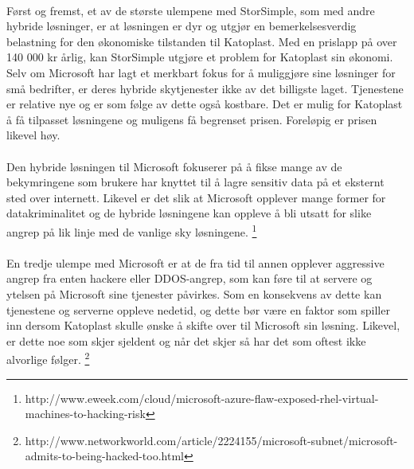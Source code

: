 \paragraph{} Først og fremst, et av de største ulempene med StorSimple, som med andre hybride løsninger, er at løsningen er dyr og utgjør en bemerkelsesverdig belastning for den økonomiske tilstanden til Katoplast. Med en prislapp på over 140 000 kr årlig, kan StorSimple utgjøre et problem for Katoplast sin økonomi. Selv om Microsoft har lagt et merkbart fokus for å muliggjøre sine løsninger for små bedrifter, er deres hybride skytjenester ikke av det billigste laget. Tjenestene er relative nye og er som følge av dette også kostbare. Det er mulig for Katoplast å få tilpasset løsningene og muligens få begrenset prisen. Foreløpig er prisen likevel høy.

\paragraph{} Den hybride løsningen til Microsoft fokuserer på å fikse mange av de bekymringene som brukere har knyttet til å lagre sensitiv data på et eksternt sted over internett. Likevel er det slik at Microsoft opplever mange former for datakriminalitet og de hybride løsningene kan oppleve å bli utsatt for slike angrep på lik linje med de vanlige sky løsningene. 
\footnote{http://www.eweek.com/cloud/microsoft-azure-flaw-exposed-rhel-virtual-machines-to-hacking-risk}

\paragraph{} En tredje ulempe med Microsoft er at de fra tid til annen opplever aggressive angrep fra enten hackere eller DDOS-angrep, som kan føre til at servere og ytelsen på Microsoft sine tjenester påvirkes. Som en konsekvens av dette kan tjenestene og serverne oppleve nedetid, og dette bør være en faktor som spiller inn dersom Katoplast skulle ønske å skifte over til Microsoft sin løsning. Likevel, er dette noe som skjer sjeldent og når det skjer så har det som oftest ikke alvorlige følger.
\footnote{http://www.networkworld.com/article/2224155/microsoft-subnet/microsoft-admits-to-being-hacked-too.html}

